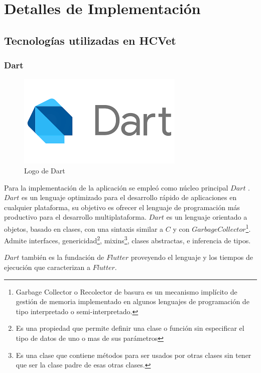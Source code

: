 \chapter{Detalles de Implementación}
\label{chapter:implementation}


\section{Tecnologías utilizadas en HCVet}


\subsection{Dart}


\begin{figure}[h!]
\begin{center}
\includegraphics[scale=0.4]{Graphics/images/LogoDart.png}
\caption{Logo de Dart}
\label{fig:rcm}

\end{center}
\end{figure}

Para la implementación de la aplicación se empleó como núcleo principal $Dart$ . $Dart$ es un lenguaje optimizado para el desarrollo rápido de aplicaciones en cualquier plataforma, su objetivo es ofrecer el lenguaje de programación más productivo para el desarrollo multiplataforma. $Dart$ es un lenguaje orientado a objetos, basado en clases, con una sintaxis similar a $C$ y con $Garbage Collector$\footnote{Garbage Collector o Recolector de basura es un mecanismo implícito de gestión de memoria implementado en algunos lenguajes de programación de tipo interpretado o semi-interpretado.}. Admite interfaces, genericidad\footnote{Es una propiedad que permite definir una clase o función sin especificar el tipo de datos de uno o mas de sus parámetros }, mixins\footnote{Es una clase que contiene métodos para ser usados por otras clases sin tener que ser la clase padre de esas otras clases. }, clases abstractas,  e inferencia de tipos. 

$Dart$ también es la fundación de $Flutter$ proveyendo el lenguaje y los tiempos de ejecución que caracterizan a $Flutter$.


